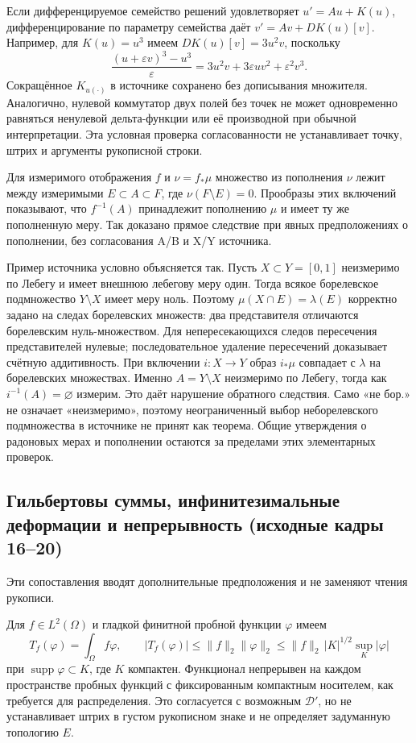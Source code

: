\documentclass[11pt]{article}
\begin{document}
Если дифференцируемое семейство решений удовлетворяет $u'=Au+K(u)$, дифференцирование по параметру семейства даёт $v'=Av+DK(u)[v]$. Например, для $K(u)=u^3$ имеем $DK(u)[v]=3u^2v$, поскольку
\[
\frac{(u+\varepsilon v)^3-u^3}{\varepsilon}
=3u^2v+3\varepsilon uv^2+\varepsilon^2v^3.
\]
Сокращённое $K_{u(\cdot)}$ в источнике сохранено без дописывания множителя. Аналогично, нулевой коммутатор двух полей без точек не может одновременно равняться ненулевой дельта-функции или её производной при обычной интерпретации. Эта условная проверка согласованности не устанавливает точку, штрих и аргументы рукописной строки.

Для измеримого отображения $f$ и $\nu=f_*\mu$ множество из пополнения $\nu$ лежит между измеримыми $E\subset A\subset F$, где $\nu(F\setminus E)=0$. Прообразы этих включений показывают, что $f^{-1}(A)$ принадлежит пополнению $\mu$ и имеет ту же пополненную меру. Так доказано прямое следствие при явных предположениях о пополнении, без согласования A/B и X/Y источника.

Пример источника условно объясняется так. Пусть $X\subset Y=[0,1]$ неизмеримо по Лебегу и имеет внешнюю лебегову меру один. Тогда всякое борелевское подмножество $Y\setminus X$ имеет меру ноль. Поэтому $\mu(X\cap E)=\lambda(E)$ корректно задано на следах борелевских множеств: два представителя отличаются борелевским нуль-множеством. Для непересекающихся следов пересечения представителей нулевые; последовательное удаление пересечений доказывает счётную аддитивность. При включении $i:X\to Y$ образ $i_*\mu$ совпадает с $\lambda$ на борелевских множествах. Именно $A=Y\setminus X$ неизмеримо по Лебегу, тогда как $i^{-1}(A)=\varnothing$ измерим. Это даёт нарушение обратного следствия. Само «не бор.» не означает «неизмеримо», поэтому неограниченный выбор неборелевского подмножества в источнике не принят как теорема. Общие утверждения о радоновых мерах и пополнении остаются за пределами этих элементарных проверок.


\subsection*{Гильбертовы суммы, инфинитезимальные деформации и непрерывность (исходные кадры 16--20)}
Эти сопоставления вводят дополнительные предположения и не заменяют чтения рукописи.

Для $f\in L^2(\Omega)$ и гладкой финитной пробной функции $\varphi$ имеем
\[
T_f(\varphi)=\int_\Omega f\varphi,\qquad
|T_f(\varphi)|\leq\|f\|_2\|\varphi\|_2
\leq\|f\|_2\,|K|^{1/2}\sup_K|\varphi|
\]
при $\operatorname{supp}\varphi\subset K$, где $K$ компактен. Функционал непрерывен на каждом пространстве пробных функций с фиксированным компактным носителем, как требуется для распределения. Это согласуется с возможным $\mathcal D'$, но не устанавливает штрих в густом рукописном знаке и не определяет задуманную топологию $E$.
\end{document}
